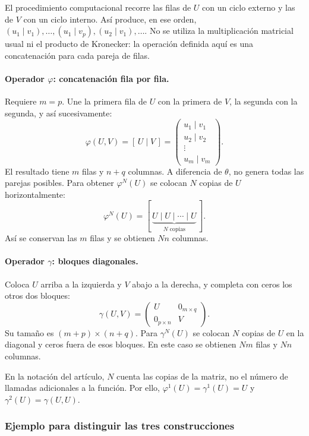 El procedimiento computacional recorre las filas de $U$ con un ciclo
externo y las de $V$ con un ciclo interno. Así produce, en ese orden,
$(u_1\mid v_1),\ldots,(u_1\mid v_p),(u_2\mid v_1),\ldots$.
No se utiliza la multiplicación matricial usual ni el producto de
Kronecker: la operación definida aquí es una concatenación para cada
pareja de filas.

\paragraph{Operador $\varphi$: concatenación fila por fila.}
Requiere $m=p$. Une la primera fila de $U$ con la primera de $V$,
la segunda con la segunda, y así sucesivamente:
\[
\varphi(U,V)=[\,U\mid V\,]
=\begin{pmatrix}
u_1\mid v_1\\
u_2\mid v_2\\
\vdots\\
u_m\mid v_m
\end{pmatrix}.
\]
El resultado tiene $m$ filas y $n+q$ columnas. A diferencia de
$\theta$, no genera todas las parejas posibles. Para obtener
$\varphi^N(U)$ se colocan $N$ copias de $U$ horizontalmente:
\[
\varphi^N(U)=[\,\underbrace{U\mid U\mid\cdots\mid U}_{N\text{ copias}}\,].
\]
Así se conservan las $m$ filas y se obtienen $Nn$ columnas.

\paragraph{Operador $\gamma$: bloques diagonales.}
Coloca $U$ arriba a la izquierda y $V$ abajo a la derecha, y completa
con ceros los otros dos bloques:
\[
\gamma(U,V)=
\begin{pmatrix}
U & 0_{m\times q}\\
0_{p\times n} & V
\end{pmatrix}.
\]
Su tamaño es $(m+p)\times(n+q)$. Para $\gamma^N(U)$ se colocan $N$
copias de $U$ en la diagonal y ceros fuera de esos bloques. En este
caso se obtienen $Nm$ filas y $Nn$ columnas.

En la notación del artículo, $N$ cuenta las copias de la matriz,
no el número de llamadas adicionales a la función. Por ello,
$\varphi^1(U)=\gamma^1(U)=U$ y
$\gamma^2(U)=\gamma(U,U)$.

\subsubsection*{Ejemplo para distinguir las tres construcciones}

